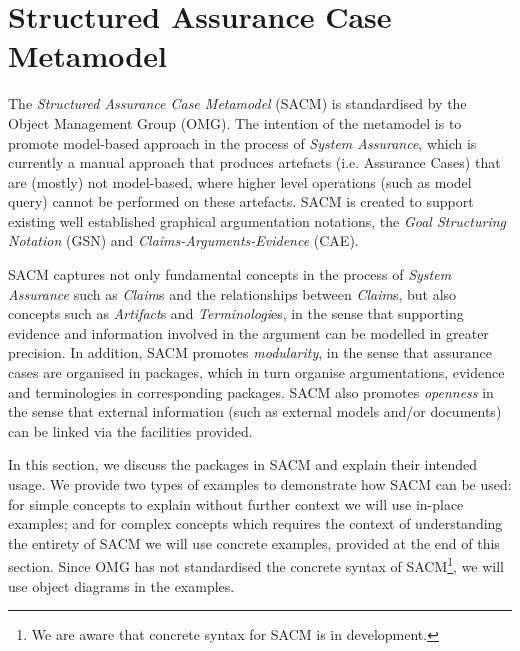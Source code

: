 \section{Structured Assurance Case Metamodel}
\label{sec:sacm}
The \textit{Structured Assurance Case Metamodel} (SACM) is standardised by the Object Management Group (OMG). 
The intention of the metamodel is to promote model-based approach in the process of \textit{System Assurance}, which is currently a manual approach that produces artefacts (i.e. Assurance Cases) that are (mostly) not model-based, where higher level operations (such as model query) cannot be performed on these artefacts. 
SACM is created to support existing well established graphical argumentation notations, the \textit{Goal Structuring Notation} (GSN) and \textit{Claims-Arguments-Evidence} (CAE). 

SACM captures not only fundamental concepts in the process of \textit{System Assurance} such as \textit{Claim}s and the relationships between \textit{Claim}s, but also concepts such as \textit{Artifact}s and \textit{Terminologi}es, in the sense that supporting evidence and information involved in the argument can be modelled in greater precision. 
In addition, SACM promotes \textit{modularity}, in the sense that assurance cases are organised in packages, which in turn organise argumentations, evidence and terminologies in corresponding packages. 
SACM also promotes \textit{openness} in the sense that external information (such as external models and/or documents) can be linked via the facilities provided. 

In this section, we discuss the packages in SACM and explain their intended usage. 
We provide two types of examples to demonstrate how SACM can be used: for simple concepts to explain without further context we will use in-place examples; and for complex concepts which requires the context of understanding the entirety of SACM we will use concrete examples, provided at the end of this section.
Since OMG has not standardised the concrete syntax of SACM\footnote{We are aware that concrete syntax for SACM is in development.}, we will use object diagrams in the examples. 

